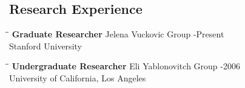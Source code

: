 \documentclass{res}
\begin{document}
\begin{resume}
\section{Research Experience}
   \vspace{-0.1in}	
   \begin{tabbing}
   \hspace{2.3in}\= \hspace{2.6in}\= \kill %
    {\bf Graduate Researcher} \>Jelena Vuckovic Group -Present\\
                             \>Stanford University
   \end{tabbing}\vspace{-20pt}      %
   \begin{tabbing}
   \hspace{2.3in}\= \hspace{2.6in}\= \kill %
    {\bf Undergraduate Researcher} \>Eli Yablonovitch Group -2006\\
                          \>University of California, Los Angeles
   \end{tabbing}\vspace{-20pt}
   
\end{resume}
\end{document}
